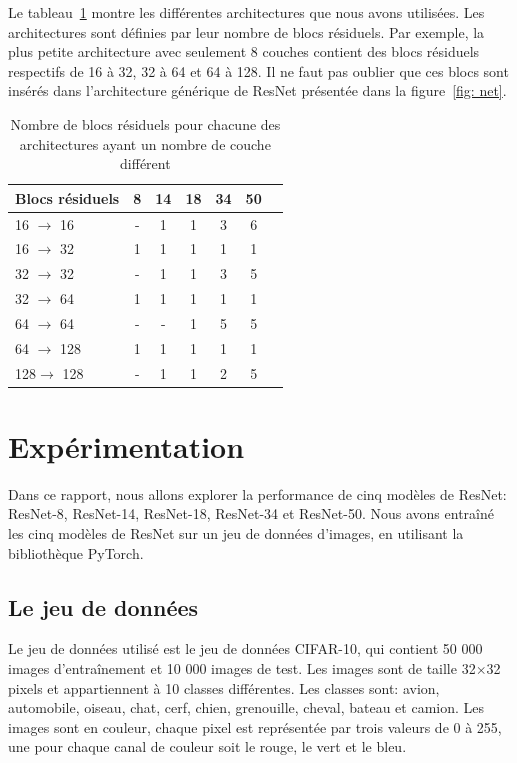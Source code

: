 \documentclass{article}
\begin{document}
Le tableau~\ref{tab:resnet} montre les différentes architectures que nous avons utilisées. Les architectures sont
définies par leur nombre de blocs résiduels. Par exemple, la plus petite architecture avec seulement 8 couches contient
des blocs résiduels respectifs de 16 à 32, 32 à 64 et 64 à 128. Il ne faut pas oublier que ces blocs sont insérés dans l'architecture
générique de ResNet présentée dans la figure~\ref{fig: net}.

\begin{table}[H]
\centering
\begin{tabular}{lcccccc}
\hline
Blocs résiduels & 8 & 14 & 18 & 34 & 50 \\
\hline
16 $\rightarrow $ 16 & - & 1 & 1 & 3 & 6 \\
16 $\rightarrow $ 32 & 1 & 1 & 1 & 1 & 1 \\
32 $\rightarrow $ 32 & - & 1 & 1 & 3 & 5 \\
32 $\rightarrow $ 64 & 1 & 1 & 1 & 1 & 1 \\
64 $\rightarrow $ 64 & - & - & 1 & 5 & 5 \\
64 $\rightarrow $ 128 & 1 & 1 & 1 & 1 & 1 \\
128$\rightarrow $ 128 & - & 1 & 1 & 2 & 5 \\
\hline
\end{tabular}
\caption{Nombre de blocs résiduels pour chacune des architectures ayant un nombre de couche différent}\label{tab:resnet}
\end{table}

\section{Expérimentation}

Dans ce rapport, nous allons explorer la performance de cinq modèles de ResNet: ResNet-8, ResNet-14, ResNet-18, ResNet-34 et ResNet-50.
Nous avons entraîné les cinq modèles de ResNet sur un jeu de données d'images, en utilisant la bibliothèque PyTorch.

\subsection{Le jeu de données}

Le jeu de données utilisé est le jeu de données CIFAR-10, qui contient 50 000 images d'entraînement et 10 000 images
de test. Les images sont de taille 32$\times$32 pixels et appartiennent à 10 classes différentes. Les classes sont:
avion, automobile, oiseau, chat, cerf, chien, grenouille, cheval, bateau et camion. Les images sont en couleur,
chaque pixel est représentée par trois valeurs de 0 à 255, une pour chaque canal de couleur soit le rouge, le vert et le bleu.
\end{document}
